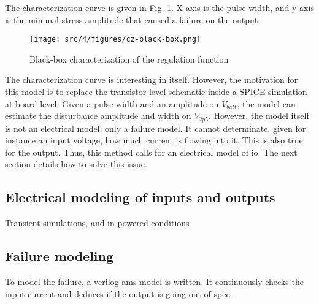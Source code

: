 
The characterization curve is given in Fig. \ref{fig:cz-black-box}.
X-axis is the pulse width, and y-axis is the minimal stress amplitude that caused a failure on the output.

\begin{figure}[!h]
  \centering
  \texttt{[image: src/4/figures/cz-black-box.png]}
  \caption{Black-box characterization of the regulation function}
  \label{fig:cz-black-box}
\end{figure}

The characterization curve is interesting in itself.
However, the motivation for this model is to replace the transistor-level schematic inside a SPICE simulation at board-level.
Given a pulse width and an amplitude on $V_{batt}$, the model can estimate the disturbance amplitude and width on $V_{2p5}$.
However, the model itself is not an electrical model, only a failure model.
It cannot determinate, given for instance an input voltage, how much current is flowing into it.
This is also true for the output.
Thus, this method calls for an electrical model of \gls{io}.
The next section details how to solve this issue.

\subsection{Electrical modeling of inputs and outputs}


Transient simulations, and in powered-conditions

%

\subsection{Failure modeling}


%
To model the failure, a verilog-ams model is written.
It continuously checks the input current and deduces if the output is going out of spec.

